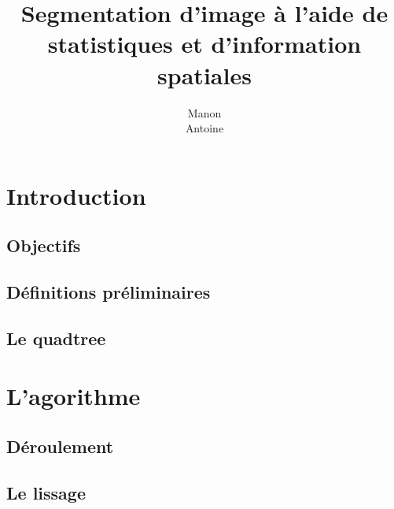 \documentclass[12pt,titlepage,a4paper]{report}
\title{Segmentation d'image à l'aide de statistiques et d'information spatiales}
\author{Manon \bsc{Ansart}\\Antoine \bsc{Augusti}}
\begin{document}
	\dominitoc
	\tableofcontents

	\chapter{Introduction}
	\minitoc
		\section{Objectifs}
			
		
		\section{Définitions préliminaires}
			

		\section{Le quadtree}
			
	\chapter{L'agorithme}
		\section{Déroulement}
			
		\section{Le lissage}
			

	
	
\end{document}
